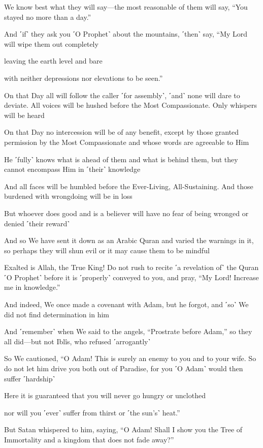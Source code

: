 We know best what they will say—the most reasonable of them will say, “You stayed no more than a day.”

And ˹if˺ they ask you ˹O Prophet˺ about the mountains, ˹then˺ say, “My Lord will wipe them out completely

leaving the earth level and bare

with neither depressions nor elevations to be seen.”

On that Day all will follow the caller ˹for assembly˺, ˹and˺ none will dare to deviate. All voices will be hushed before the Most Compassionate. Only whispers will be heard

On that Day no intercession will be of any benefit, except by those granted permission by the Most Compassionate and whose words are agreeable to Him

He ˹fully˺ knows what is ahead of them and what is behind them, but they cannot encompass Him in ˹their˺ knowledge

And all faces will be humbled before the Ever-Living, All-Sustaining. And those burdened with wrongdoing will be in loss

But whoever does good and is a believer will have no fear of being wronged or denied ˹their reward˺

And so We have sent it down as an Arabic Quran and varied the warnings in it, so perhaps they will shun evil or it may cause them to be mindful

Exalted is Allah, the True King! Do not rush to recite ˹a revelation of˺ the Quran ˹O Prophet˺ before it is ˹properly˺ conveyed to you, and pray, “My Lord! Increase me in knowledge.”

And indeed, We once made a covenant with Adam, but he forgot, and ˹so˺ We did not find determination in him

And ˹remember˺ when We said to the angels, “Prostrate before Adam,” so they all did—but not Iblîs, who refused ˹arrogantly˺

So We cautioned, “O Adam! This is surely an enemy to you and to your wife. So do not let him drive you both out of Paradise, for you ˹O Adam˺ would then suffer ˹hardship˺

Here it is guaranteed that you will never go hungry or unclothed

nor will you ˹ever˺ suffer from thirst or ˹the sun’s˺ heat.”

But Satan whispered to him, saying, “O Adam! Shall I show you the Tree of Immortality and a kingdom that does not fade away?”


